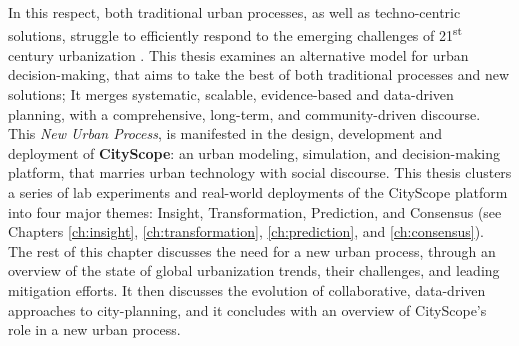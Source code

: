 {    \newline
    In this respect, both traditional urban processes, as well as techno-centric solutions, struggle to efficiently respond to the emerging challenges of 21\textsuperscript{st} century urbanization \cite{soderstrom2014smart,UnitedNationsHabitatIII2017, Hollands2008}. This thesis examines an alternative model for urban decision-making, that aims to take the best of both traditional processes and new solutions; It merges systematic, scalable, evidence-based and data-driven planning, with a comprehensive, long-term, and community-driven discourse. This \textit{New Urban Process}, is manifested in the design, development and deployment of \textbf{CityScope}: an urban modeling, simulation, and decision-making platform, that marries urban technology with social discourse. This thesis clusters a series of lab experiments and real-world deployments of the CityScope platform into four major themes: Insight, Transformation, Prediction, and Consensus (see Chapters \eqref{ch:insight}, \eqref{ch:transformation}, \eqref{ch:prediction}, and \eqref{ch:consensus}).
    \newline
    The rest of this chapter discusses the need for a new urban process, through an overview of the state of global urbanization trends, their challenges, and leading mitigation efforts. It then discusses the evolution of collaborative, data-driven approaches to city-planning, and it concludes with an overview of CityScope's role in a new urban process.
}


